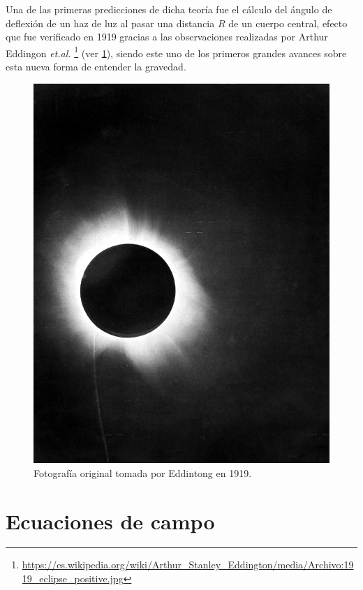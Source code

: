 Una de las primeras predicciones de dicha teoría fue el cálculo del ángulo de deflexión de un haz de luz al pasar una distancia $R$ de un cuerpo central, efecto que fue verificado en 1919 gracias a las observaciones realizadas por Arthur Eddingon \textit{et.al.} \footnote{\url{https://es.wikipedia.org/wiki/Arthur_Stanley_Eddington/media/Archivo:1919_eclipse_positive.jpg}} \cite{Coles} (ver \ref{fig:6}), siendo este uno de los primeros grandes avances sobre esta nueva forma de entender la gravedad.
\begin{figure}[!ht]
\centering
\includegraphics[scale=0.5]{images/1919eclipse.jpg}
\caption[Fotografía tomada por Eddintong]{Fotografía original tomada por Eddintong en 1919.}
\label{fig:6}
\end{figure}

\section{Ecuaciones de campo}
\label{sec:3}

